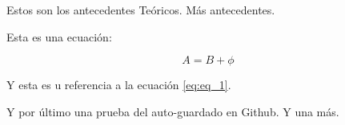 Estos son los antecedentes Teóricos. Más antecedentes.

Esta es una ecuación:

\begin{equation}
	A = B + \phi
	\label{eq:eq_1}
\end{equation}

Y esta es u referencia a la ecuación \eqref{eq:eq_1}. 

Y por último una prueba del auto-guardado en Github. Y una más.